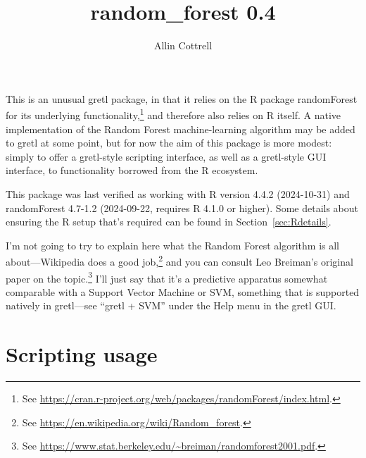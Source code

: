\documentclass{article}
\begin{document}
\setlength{\parindent}{0pt}
\setlength{\parskip}{1ex}

\title{random\_forest 0.4} \author{Allin Cottrell}
\maketitle

This is an unusual gretl package, in that it relies on the \textsf{R}
package \textsf{randomForest} for its underlying
functionality,\footnote{See
  \url{https://cran.r-project.org/web/packages/randomForest/index.html}.}
and therefore also relies on \textsf{R} itself. A native
implementation of the Random Forest machine-learning algorithm may be
added to gretl at some point, but for now the aim of this package is
more modest: simply to offer a gretl-style scripting interface, as
well as a gretl-style GUI interface, to functionality borrowed from
the \textsf{R} ecosystem.

This package was last verified as working with \textsf{R} version
4.4.2 (2024-10-31) and \textsf{randomForest} 4.7-1.2 (2024-09-22,
requires \textsf{R} 4.1.0 or higher). Some details about ensuring the
\textsf{R} setup that's required can be found in
Section~\ref{sec:Rdetails}.

I'm not going to try to explain here what the Random Forest algorithm
is all about---Wikipedia does a good job,\footnote{See
  \url{https://en.wikipedia.org/wiki/Random_forest}.} and you can
consult Leo Breiman's original paper on the topic.\footnote{See
  \url{https://www.stat.berkeley.edu/~breiman/randomforest2001.pdf}.}
I'll just say that it's a predictive apparatus somewhat comparable
with a Support Vector Machine or SVM, something that is supported
natively in gretl---see ``gretl + SVM'' under the \textsf{Help} menu
in the gretl GUI.

\section{Scripting usage}
\end{document}
